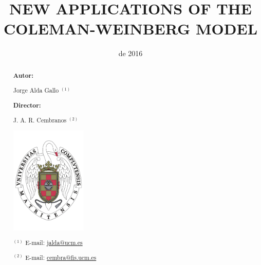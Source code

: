 \documentclass[aps,prd,preprintnumbers,nofootinbibn,twocolumn]{revtex4}
\begin{document}
\title{NEW APPLICATIONS OF THE COLEMAN-WEINBERG MODEL\\[0.4cm]}
\thispagestyle{empty}


\date{de 2016}


\begin{abstract}
\begin{center}
\vspace{0.7cm}

{\bf Autor:}\\

\vspace{0.2cm}

Jorge Alda Gallo $^{(1)}$\\

\vspace{1cm}

{\bf Director:}\\

\vspace{0.2cm}

J. A. R. Cembranos $^{(2)}$\\

\vspace{0.6cm}


\vspace{5cm}
\begin{center}
\includegraphics[width=0.30\textwidth]{ucmlogo}
\end{center}
\vspace{5cm}
\end{center}

$^{(1)}$  E-mail: \href{mailto:jalda@ucm.es}{jalda@ucm.es}

$^{(2)}$ E-mail: \href{mailto:cembra@fis.ucm.es}{cembra@fis.ucm.es}
\vspace{8cm}

\end{abstract}




\clearpage
\end{document}
